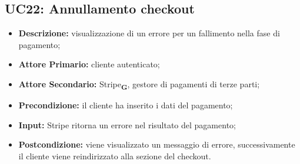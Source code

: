 \subsection{UC22: Annullamento checkout}
\label{sec:UC22}
\begin{itemize}
    \item \textbf{Descrizione:} visualizzazione di un errore per un fallimento nella fase di pagamento;
    \item \textbf{Attore Primario:} cliente autenticato;
    \item \textbf{Attore Secondario:} Stripe\textsubscript{\textbf{G}}, gestore di pagamenti di terze parti;
    \item \textbf{Precondizione:} il cliente ha inserito i dati del pagamento;
    \item \textbf{Input:} Stripe ritorna un errore nel risultato del pagamento;
    \item \textbf{Postcondizione:} viene visualizzato un messaggio di errore, successivamente il cliente viene reindirizzato alla sezione del checkout.
\end{itemize}
